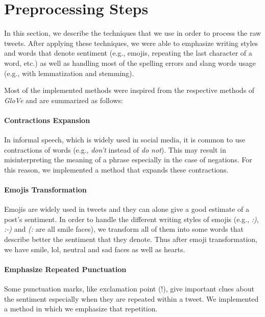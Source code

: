\section{Preprocessing Steps}
\label{sec:preprocessing}
In this section, we describe the techniques that we use in order to process the raw tweets.
After applying these techniques, we were able to emphasize writing styles and words that denote sentiment (e.g., emojis, repeating the last character of a word, etc.)
as well as handling most of the spelling errors and slang words usage (e.g., with lemmatization and stemming).

Most of the implemented methods were inspired from the respective methods of \textit{GloVe} \cite{pennington2014glove} and are summarized as follows:

\noindent
\paragraph{\textbf{Contractions Expansion}}
{\setlength{\parindent}{0cm}
In informal speech, which is widely used in social media, it is common to use contractions of words (e.g., \textit{don't} instead of \textit{do not}).
This may result in misinterpreting the meaning of a phrase especially in the case of negations.
For this reason, we implemented a method that expands these contractions.}

\paragraph{\textbf{Emojis Transformation}}
{\setlength{\parindent}{0cm}
Emojis are widely used in tweets and they can alone give a good estimate of a post's sentiment.
In order to handle the different writing styles of emojis (e.g., \textit{:)}, \textit{:-)} and \textit{(:} are all smile faces), we transform all of them into some words that describe better the sentiment that they denote.
Thus after emoji transformation, we have smile, lol, neutral and sad faces as well as hearts.}

\paragraph{\textbf{Emphasize Repeated Punctuation}}
{\setlength{\parindent}{0cm}
Some punctuation marks, like exclamation point (!), give important clues about the sentiment especially when they are repeated within a tweet. 
We implemented a method in which we emphasize that repetition.}

